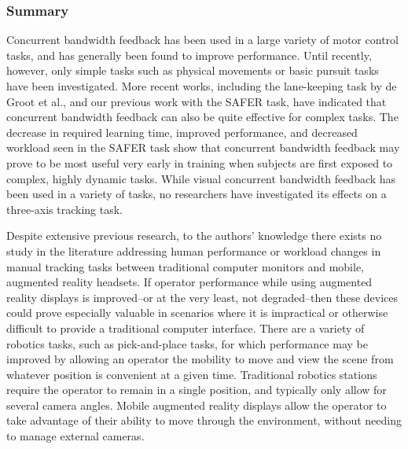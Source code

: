 \subsubsection{Summary}
Concurrent bandwidth feedback has been used in a large variety of motor control tasks, and has generally been found to improve performance.
Until recently, however, only simple tasks such as physical movements or basic pursuit tasks have been investigated.
More recent works, including the lane-keeping task by de Groot et al., and our previous work with the SAFER task, have indicated that concurrent bandwidth feedback can also be quite effective for complex tasks.
The decrease in required learning time, improved performance, and decreased workload seen in the SAFER task show that concurrent bandwidth feedback may prove to be most useful very early in training when subjects are first exposed to complex, highly dynamic tasks.
While visual concurrent bandwidth feedback has been used in a variety of tasks, no researchers have investigated its effects on a three-axis tracking task.

Despite extensive previous research, to the authors' knowledge there exists no study in the literature addressing human performance or workload changes in manual tracking tasks between traditional computer monitors and mobile, augmented reality headsets.
If operator performance while using augmented reality displays is improved--or at the very least, not degraded--then these devices could prove especially valuable in scenarios where it is impractical or otherwise difficult to provide a traditional computer interface.
There are a variety of robotics tasks, such as pick-and-place tasks, for which performance may be improved by allowing an operator the mobility to move and view the scene from whatever position is convenient at a given time.
Traditional robotics stations require the operator to remain in a single position, and typically only allow for several camera angles.
Mobile augmented reality displays allow the operator to take advantage of their ability to move through the environment, without needing to manage external cameras.

